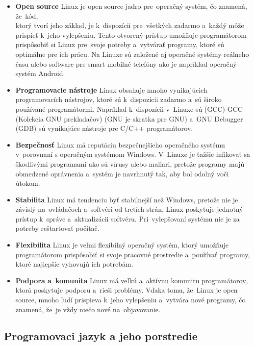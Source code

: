 \begin{itemize}
	\item \textbf{Open source} Linux je open source jadro pre~operačný systém, čo znamená, že~kód,\\
		ktorý tvorí jeho základ, je k~dispozícii pre~všetkých zadarmo a~každý môže prispieť
		k~jeho vylepšeniu. Tento otvorený prístup umožňuje programátorom prispôsobiť si Linux
		pre~svoje potreby a~vytvárať programy, ktoré sú optimálne pre ich prácu. Na Linuxe
		sú založené aj operačné systémy reálneho času alebo software pre smart mobilné telefóny
		ako je napríklad operačný systém Android.

	\item \textbf{Programovacie nástroje} Linux obsahuje mnoho vynikajúcich programovacích nástrojov, ktoré sú k~dispozícii
		zadarmo a~sú široko používané programátormi. Napríklad k~dispozícii v~Linuxe sú (GCC) \acrlong{GCC} (Kolekcia GNU prekladačov)
		(GNU je skratka pre \acrlong{GNU}) a~GNU Debugger (GDB) sú vynikajúce nástroje pre C/C++ programátorov.

	\item \textbf{Bezpečnosť} Linux má reputáciu bezpečnejšieho operačného systému v~porovnaní s operačným systémom Windows.
		V~Linuxe je ťažšie infikovať sa škodlivými programami ako sú vírusy alebo maliari, pretože programy majú obmedzené
		oprávnenia a~systém je navrhnutý tak, aby bol odolný voči útokom.

	\item \textbf{Stabilita} Linux má tendenciu byť stabilnejší než Windows, pretože nie je závislý na~ovládačoch a~softvéri
		od tretích strán. Linux poskytuje jednotný prístup k~správe a~aktualizácii softvéru. Pri~vylepšovaní systému nie je
		za potreby reštartovať počítač.

	\item \textbf{Flexibilita} Linux je veľmi flexibilný operačný systém, ktorý umožňuje programátorom prispôsobiť si svoje pracovné
		prostredie a~používať programy, ktoré najlepšie vyhovujú ich potrebám.

	\item \textbf{Podpora a~komunita} Linux má veľkú a~aktívnu komunitu programátorov, ktorá poskytuje podporu a~rieši problémy.
		Vďaka tomu, že~Linux je open source, mnoho ľudí prispieva k~jeho vylepšeniu a~vytvára nové programy, čo znamená, že~je vždy
		niečo nové na~objavovanie.
\end{itemize}

\subsection{Programovaci jazyk a jeho porstredie}
\label{sec:programovaci_jazyk}

